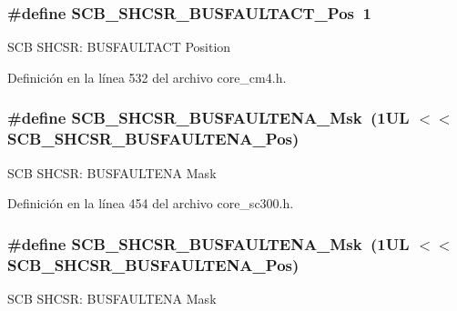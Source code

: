 \subsubsection[{\texorpdfstring{S\+C\+B\+\_\+\+S\+H\+C\+S\+R\+\_\+\+B\+U\+S\+F\+A\+U\+L\+T\+A\+C\+T\+\_\+\+Pos}{SCB_SHCSR_BUSFAULTACT_Pos}}]{\setlength{\rightskip}{0pt plus 5cm}\#define S\+C\+B\+\_\+\+S\+H\+C\+S\+R\+\_\+\+B\+U\+S\+F\+A\+U\+L\+T\+A\+C\+T\+\_\+\+Pos~1}\hypertarget{group___c_m_s_i_s___s_c_b_gaf272760f2df9ecdd8a5fbbd65c0b767a}{}\label{group___c_m_s_i_s___s_c_b_gaf272760f2df9ecdd8a5fbbd65c0b767a}
S\+CB S\+H\+C\+SR\+: B\+U\+S\+F\+A\+U\+L\+T\+A\+CT Position 

Definición en la línea 532 del archivo core\+\_\+cm4.\+h.

\subsubsection[{\texorpdfstring{S\+C\+B\+\_\+\+S\+H\+C\+S\+R\+\_\+\+B\+U\+S\+F\+A\+U\+L\+T\+E\+N\+A\+\_\+\+Msk}{SCB_SHCSR_BUSFAULTENA_Msk}}]{\setlength{\rightskip}{0pt plus 5cm}\#define S\+C\+B\+\_\+\+S\+H\+C\+S\+R\+\_\+\+B\+U\+S\+F\+A\+U\+L\+T\+E\+N\+A\+\_\+\+Msk~(1\+U\+L $<$$<$ S\+C\+B\+\_\+\+S\+H\+C\+S\+R\+\_\+\+B\+U\+S\+F\+A\+U\+L\+T\+E\+N\+A\+\_\+\+Pos)}\hypertarget{group___c_m_s_i_s___s_c_b_ga43e8cbe619c9980e0d1aacc85d9b9e47}{}\label{group___c_m_s_i_s___s_c_b_ga43e8cbe619c9980e0d1aacc85d9b9e47}
S\+CB S\+H\+C\+SR\+: B\+U\+S\+F\+A\+U\+L\+T\+E\+NA Mask 

Definición en la línea 454 del archivo core\+\_\+sc300.\+h.

\subsubsection[{\texorpdfstring{S\+C\+B\+\_\+\+S\+H\+C\+S\+R\+\_\+\+B\+U\+S\+F\+A\+U\+L\+T\+E\+N\+A\+\_\+\+Msk}{SCB_SHCSR_BUSFAULTENA_Msk}}]{\setlength{\rightskip}{0pt plus 5cm}\#define S\+C\+B\+\_\+\+S\+H\+C\+S\+R\+\_\+\+B\+U\+S\+F\+A\+U\+L\+T\+E\+N\+A\+\_\+\+Msk~(1\+U\+L $<$$<$ S\+C\+B\+\_\+\+S\+H\+C\+S\+R\+\_\+\+B\+U\+S\+F\+A\+U\+L\+T\+E\+N\+A\+\_\+\+Pos)}\hypertarget{group___c_m_s_i_s___s_c_b_ga43e8cbe619c9980e0d1aacc85d9b9e47}{}\label{group___c_m_s_i_s___s_c_b_ga43e8cbe619c9980e0d1aacc85d9b9e47}
S\+CB S\+H\+C\+SR\+: B\+U\+S\+F\+A\+U\+L\+T\+E\+NA Mask 

